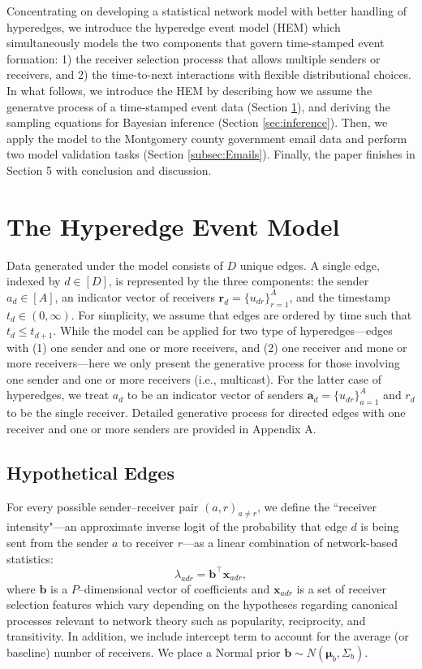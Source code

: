 \documentclass[ba]{imsart}
\numberwithin{equation}{section}
\theoremstyle{plain}
\begin{document}
Concentrating on developing a statistical network model with better handling of hyperedges, we introduce the hyperedge event model (HEM) which simultaneously models the two components that govern time-stamped event formation: 1) the receiver selection processs that allows multiple senders or receivers, and 2) the time-to-next interactions with flexible distributional choices. In what follows, we introduce the HEM by describing how we assume the generatve process of a time-stamped event data (Section \ref{sec:generative process}), and deriving the sampling equations for Bayesian inference (Section \ref{sec:inference}). Then, we apply the model to the Montgomery county government email data and perform two model validation tasks (Section \ref{subsec:Emails}). Finally, the paper finishes in Section 5 with conclusion and discussion.
\section{The Hyperedge Event Model}\label{sec:generative process}

Data generated under the model consists of $D$ unique edges. A single edge, indexed by $d \in [D]$, is represented by the three components: the sender $a_d \in [A]$, an indicator vector of receivers $\boldsymbol{r}_d = \{u_{dr} \}_{r=1}^{A}$, and the timestamp $t_d \in (0, \infty)$. For simplicity, we assume that edges are ordered by time such that $t_d \leq t_{d+1}$. While the model can be applied for two type of hyperedges---edges with (1) one sender and one or more receivers, and (2) one receiver and mone or more receivers---here we only present the generative process for those involving one sender and one or more receivers (i.e., multicast). For the latter case of hyperedges, we treat $a_d$ to be an indicator vector of senders $\boldsymbol{a}_d = \{u_{dr} \}_{a=1}^{A}$ and $r_d$ to be the single receiver. Detailed generative process for directed edges with one receiver and one or more senders are provided in Appendix A.

\subsection{Hypothetical Edges}\label{subsec: Tie}
For every possible sender--receiver pair $(a,r)_{a \neq r}$, we define the ``receiver intensity"---an approximate inverse logit of the probability that edge $d$ is being sent from the sender $a$ to receiver $r$---as a linear combination of network-based statistics:
\begin{equation}
\lambda_{adr} = {\boldsymbol{b}}^{\top}\boldsymbol{x}_{adr},
\end{equation}
where $\boldsymbol{b}$ is a $P$--dimensional vector of coefficients and $\boldsymbol{x}_{adr}$ is a set of receiver selection features which vary depending on the hypotheses regarding canonical processes relevant to network theory such as popularity, reciprocity, and transitivity. In addition, we include intercept term to account for the average (or baseline) number of receivers. We place a Normal prior $\boldsymbol{b} \sim N(\boldsymbol{\mu}_b, \Sigma_b)$.
\end{document}
